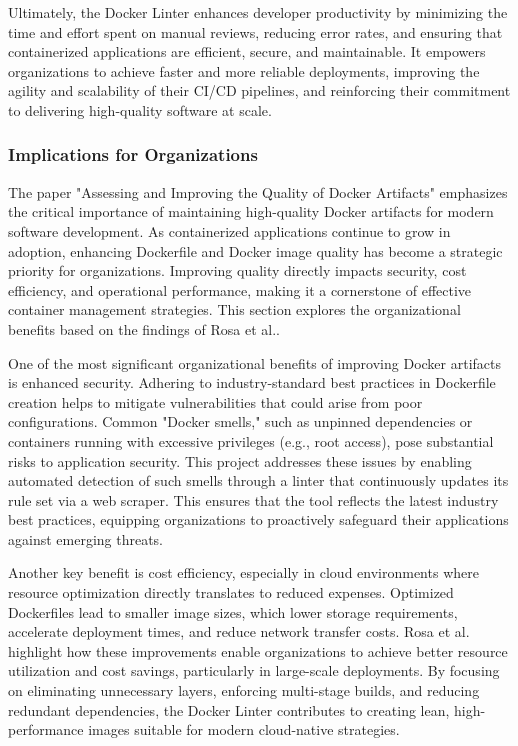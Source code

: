 Ultimately, the Docker Linter enhances developer productivity by minimizing the time and effort spent on manual reviews, reducing error rates, and ensuring that containerized applications are efficient, secure, and maintainable. It empowers organizations to achieve faster and more reliable deployments, improving the agility and scalability of their CI/CD pipelines, and reinforcing their commitment to delivering high-quality software at scale.

\subsubsection{Implications for Organizations}

The paper "Assessing and Improving the Quality of Docker Artifacts" emphasizes the critical importance of maintaining high-quality Docker artifacts for modern software development. As containerized applications continue to grow in adoption, enhancing Dockerfile and Docker image quality has become a strategic priority for organizations. Improving quality directly impacts security, cost efficiency, and operational performance, making it a cornerstone of effective container management strategies. This section explores the organizational benefits based on the findings of Rosa et al.\cite{DockerArtifacts}.

One of the most significant organizational benefits of improving Docker artifacts is enhanced security. Adhering to industry-standard best practices in Dockerfile creation helps to mitigate vulnerabilities that could arise from poor configurations. Common "Docker smells," such as unpinned dependencies or containers running with excessive privileges (e.g., root access), pose substantial risks to application security. This project addresses these issues by enabling automated detection of such smells through a linter that continuously updates its rule set via a web scraper. This ensures that the tool reflects the latest industry best practices, equipping organizations to proactively safeguard their applications against emerging threats.

Another key benefit is cost efficiency, especially in cloud environments where resource optimization directly translates to reduced expenses. Optimized Dockerfiles lead to smaller image sizes, which lower storage requirements, accelerate deployment times, and reduce network transfer costs. Rosa et al. highlight how these improvements enable organizations to achieve better resource utilization and cost savings, particularly in large-scale deployments. By focusing on eliminating unnecessary layers, enforcing multi-stage builds, and reducing redundant dependencies, the Docker Linter contributes to creating lean, high-performance images suitable for modern cloud-native strategies.


